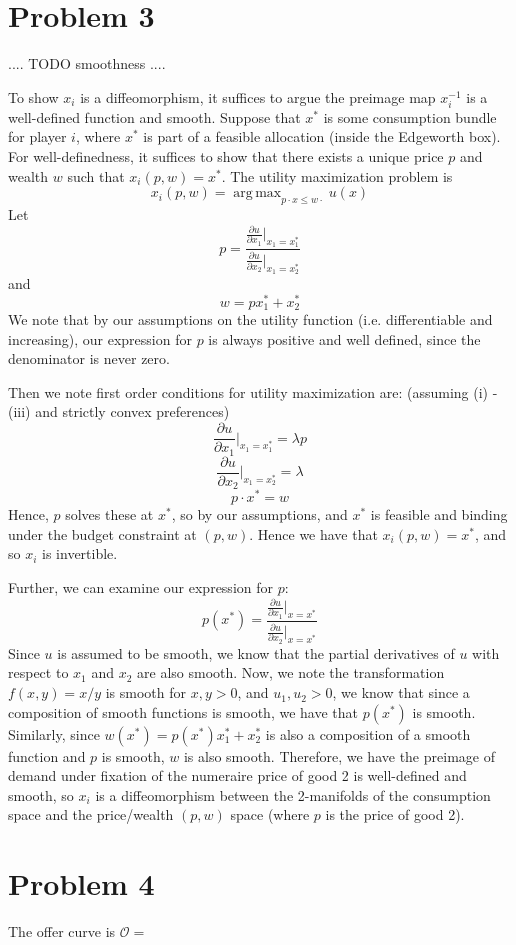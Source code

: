 \documentclass[10pt,letter]{article}
\DeclareMathOperator*{\argmax}{arg\,max}
\begin{document}
\section*{Problem 3}
.... TODO smoothness ....

To show $x_i$ is a diffeomorphism, it suffices to argue the preimage map $x_i^{-1}$ is a well-defined function and smooth. Suppose that $x^*$ is some consumption bundle for player $i$, where $x^*$ is part of a feasible allocation (inside the Edgeworth box). For well-definedness, it suffices to show that there exists a unique price $p$ and wealth $w$ such that $x_i(p,w) = x^*$. The utility maximization problem is
\[ x_i(p,w) = \argmax_{p\cdot x \le w \cdot } u(x) \]
Let
\[ p = \frac{\frac{\partial u}{\partial x_1} \Bigr|_{x_1 = x^*_1}}{\frac{\partial u}{\partial x_2} \Bigr|_{x_1 = x^*_2}} \]
and
\[ w = p x^*_1 + x^*_2  \]
We note that by our assumptions on the utility function (i.e. differentiable and increasing), our expression for $p$ is always positive and well defined, since the denominator is never zero.

Then we note first order conditions for utility maximization are: (assuming (i) - (iii) and strictly convex preferences)
\[ \frac{\partial u}{\partial x_1} \Bigr|_{x_1 = x^*_1} = \lambda p \]
\[ \frac{\partial u}{\partial x_2} \Bigr|_{x_1 = x^*_2} = \lambda  \]
\[ p \cdot x^* = w  \]
Hence, $p$ solves these at $x^*$, so by our assumptions, and $x^*$ is feasible and binding under the budget constraint at $(p,w)$. Hence we have that
$x_i(p,w) = x^*$, and so $x_i$ is invertible.

Further, we can examine our expression for $p$:
\[ p(x^*) = \frac{\frac{\partial u}{\partial x_1} \Bigr|_{x = x^*}}{\frac{\partial u}{\partial x_2} \Bigr|_{x = x^*}} \]
Since $u$ is assumed to be smooth, we know that the partial derivatives of $u$ with respect to $x_1$ and $x_2$ are also smooth. Now, we note the transformation $f(x,y) = x/y$ is smooth for $x,y > 0$, and $u_1, u_2 > 0$, we know that since a composition of smooth functions is smooth, we have that $p(x^*)$ is smooth. Similarly, since $w(x^*) = p(x^*) x^*_1 + x^*_2$ is also a composition of a smooth function and $p$ is smooth, $w$ is also smooth. Therefore, we have the preimage of demand under fixation of the numeraire price of good 2 is well-defined and smooth, so $x_i$ is a diffeomorphism between the 2-manifolds of the consumption space and the price/wealth $(p,w)$ space (where $p$ is the price of good 2).

\section*{Problem 4}
The offer curve is $\mathcal{O} = $
\end{document}
